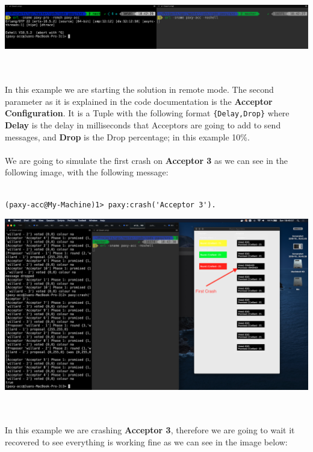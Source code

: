 \documentclass[a4paper, 10pt]{article}
\begin{document}
\begin{minipage}[t]{\linewidth}
  \centering
  \includegraphics[width=\textwidth]{init_remote}
\end{minipage}\\\\

In this example we are starting the solution in remote mode. The second
parameter as it is explained in the code documentation is the \textbf{Acceptor
  Configuration}. It is a Tuple with the following format
\lstinline|{Delay,Drop}| where \textbf{Delay} is the delay in milliseconds that
Acceptors are going to add to send messages, and \textbf{Drop} is the Drop percentage; in this example 10\%.
\\\\
We are going to simulate the first crash on \textbf{Acceptor 3} as we can see in
the following image, with the following message:
\\\\
\begin{lstlisting}
(paxy-acc@My-Machine)1> paxy:crash('Acceptor 3').
\end{lstlisting}

\begin{minipage}[t]{\linewidth}
  \centering
  \includegraphics[width=\textwidth]{1crash_acc3}
\end{minipage}\\\\

In this example we are crashing \textbf{Acceptor 3}, therefore we are going to
wait it recovered to see everything is working fine as we can see in the image
below:\\\\
\end{document}
